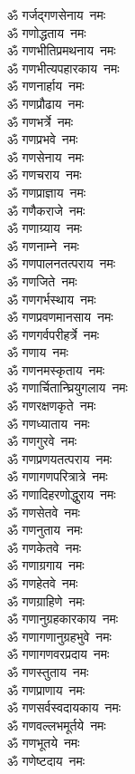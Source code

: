 \begin{multicols}{2}
\begin{flushleft}
ॐ गर्जद्गणसेनाय~नमः\\
ॐ गणोद्धताय~नमः\\
ॐ गणभीतिप्रमथनाय~नमः\\
ॐ गणभीत्यपहारकाय~नमः\\
ॐ गणनार्हाय~नमः\\
ॐ गणप्रौढाय~नमः\\
ॐ गणभर्त्रे~नमः\\
ॐ गणप्रभवे~नमः\\
ॐ गणसेनाय~नमः\\
ॐ गणचराय~नमः\hfill{}\\
ॐ गणप्राज्ञाय~नमः\\
ॐ गणैकराजे~नमः\\
ॐ गणाग्र्याय~नमः\\
ॐ गणनाम्ने~नमः\\
ॐ गणपालनतत्पराय~नमः\\
ॐ गणजिते~नमः\\
ॐ गणगर्भस्थाय~नमः\\
ॐ गणप्रवणमानसाय~नमः\\
ॐ गणगर्वपरीहर्त्रे~नमः\\
ॐ गणाय~नमः\hfill{}\\
ॐ गणनमस्कृताय~नमः\\
ॐ गणार्चितान्घ्रियुगलाय~नमः\\
ॐ गणरक्षणकृते~नमः\\
ॐ गणध्याताय~नमः\\
ॐ गणगुरवे~नमः\\
ॐ गणप्रणयतत्पराय~नमः\\
ॐ गणागणपरित्रात्रे~नमः\\
ॐ गणादिहरणोद्धुराय~नमः\\
ॐ गणसेतवे~नमः\\
ॐ गणनुताय~नमः\hfill{}\\
ॐ गणकेतवे~नमः\\
ॐ गणाग्रगाय~नमः\\
ॐ गणहेतवे~नमः\\
ॐ गणग्राहिणे~नमः\\
ॐ गणानुग्रहकारकाय~नमः\\
ॐ गणागणानुग्रहभुवे~नमः\\
ॐ गणागणवरप्रदाय~नमः\\
ॐ गणस्तुताय~नमः\\
ॐ गणप्राणाय~नमः\\
ॐ गणसर्वस्वदायकाय~नमः\hfill{}\\
ॐ गणवल्लभमूर्तये~नमः\\
ॐ गणभूतये~नमः\\
ॐ गणेष्टदाय~नमः\\

\end{flushleft}
\end{multicols}
